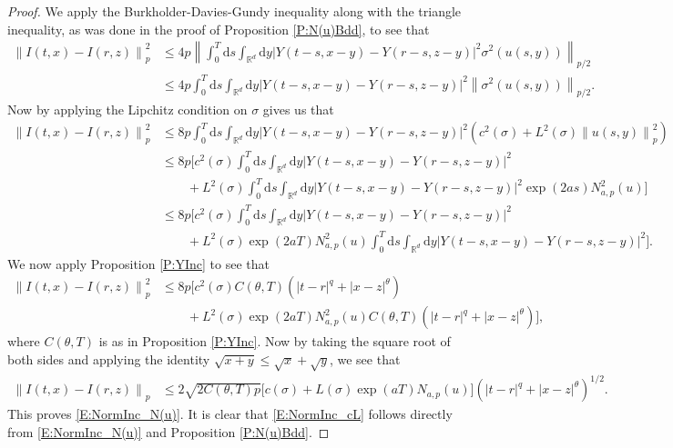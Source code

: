 \documentclass[12pt]{report}
\theoremstyle{plain}
\theoremstyle{definition}
\numberwithin{equation}{section}
\newcommand{\R}{\mathbb{R}}
\newcommand{\Norm}[1]{\left\|  #1   \right\|}
\newcommand{\ud}{\ensuremath{ \mathrm{d} }}
\begin{document}
\begin{proof}
	We apply the Burkholder-Davies-Gundy inequality along with the triangle inequality, as was done in the proof of Proposition \ref{P:N(u)Bdd},  to see that
	\begin{align*}
	\Norm{I(t,x) - I(r,z)}_p^2 &\le 4p \Norm{ \int_0^T \ud s \int_{\R^d} \ud y \left| Y(t-s,x-y) - Y(r-s,z-y) \right|^2\sigma^2(u(s,y)) }_{p/2} \\
	&\le 4p \int_0^T \ud s \int_{\R^d} \ud y \left| Y(t-s,x-y) - Y(r-s,z-y) \right|^2  \Norm{\sigma^2(u(s,y)) }_{p/2}.
	\end{align*} 
	Now by applying the Lipchitz condition on $\sigma$ gives us that 
	\begin{align*}
	\Norm{I(t,x) - I(r,z)}_p^2 &\le 8p \int_0^T \ud s \int_{\R^d} \ud y \left| Y(t-s,x-y) - Y(r-s,z-y) \right|^2 \left( c^2(\sigma) + L^2(\sigma)\Norm{u(s,y)}_{p}^2\right) \\
	&\le 8p\Bigg[ c^2(\sigma)   \int_0^T \ud s \int_{\R^d} \ud y \left| Y(t-s,x-y) - Y(r-s,z-y) \right|^2 \\
	& \qquad+ L^2(\sigma) \int_0^T \ud s \int_{\R^d} \ud y \left| Y(t-s,x-y) - Y(r-s,z-y) \right|^2 \exp\left(2as\right)N_{a,p}^2(u)  \Bigg] \\
	&\le 8p\Bigg[ c^2(\sigma)   \int_0^T \ud s \int_{\R^d} \ud y \left| Y(t-s,x-y) - Y(r-s,z-y) \right|^2 \\
	& \qquad+ L^2(\sigma) \exp\left(2aT \right)N_{a,p}^2(u)  \int_0^T \ud s \int_{\R^d} \ud y \left| Y(t-s,x-y) - Y(r-s,z-y) \right|^2  \Bigg]. 
	\end{align*}
	We now apply Proposition \ref{P:YInc} to see that 
	\begin{align*}
	\Norm{I(t,x) - I(r,z)}_p^2 &\le 8p \bigg[ c^2(\sigma)C(\theta, T)\left(|t-r|^{q} + |x-z|^{\theta}\right)\\ 
	& \qquad +  L^2(\sigma) \exp\left(2aT \right)N_{a,p}^2(u) C(\theta, T)\left(|t-r|^{q} + |x-z|^{\theta}\right) \bigg],
	\end{align*}
	where $C(\theta, T)$ is as in Proposition \ref{P:YInc}. Now by taking the square root of both sides and applying the identity $\sqrt{x+y} \le \sqrt{x} + \sqrt{y}$, we see that
	\begin{align*}
	\Norm{I(t,x) - I(r,z)}_p &\le 2\sqrt{2C(\theta, T)p} \Big[ c(\sigma) + L(\sigma) \exp\left(aT \right)N_{a,p}(u) \Big]\left(|t-r|^{q} + |x-z|^{\theta}\right)^{1/2}. 
	\end{align*}
	This proves \eqref{E:NormInc_N(u)}. It is clear that \eqref{E:NormInc_cL} follows directly from \eqref{E:NormInc_N(u)} and Proposition \ref{P:N(u)Bdd}. 
\end{proof}
\end{document}

